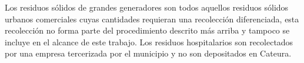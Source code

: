 Los residuos sólidos de grandes generadores son todos aquellos residuos sólidos urbanos comerciales cuyas cantidades requieran una recolección diferenciada, esta recolección no forma parte del procedimiento descrito más arriba y tampoco se incluye en el alcance de este trabajo. Los residuos hospitalarios son recolectados por una empresa tercerizada por el municipio y no son depositados en Cateura.


